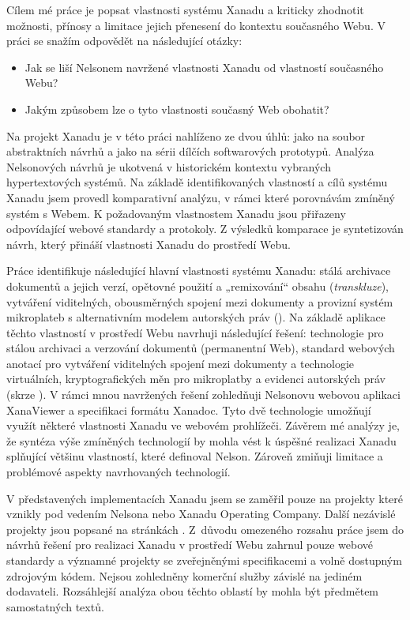 Cílem mé práce je popsat vlastnosti systému Xanadu a kriticky zhodnotit možnosti, přínosy a limitace jejich přenesení do kontextu současného Webu.
V práci se snažím odpovědět na následující otázky:

\begin{itemize}
\item Jak se liší Nelsonem navržené vlastnosti Xanadu od vlastností současného Webu?
\item Jakým způsobem lze o tyto vlastnosti současný Web obohatit?
\end{itemize}

Na projekt Xanadu je v této práci nahlíženo ze dvou úhlů: jako na soubor abstraktních návrhů a jako na sérii dílčích softwarových prototypů. Analýza Nelsonových návrhů je ukotvená v historickém kontextu vybraných hypertextových systémů. Na základě identifikovaných vlastností a cílů systému Xanadu jsem provedl komparativní analýzu, v rámci které porovnávám zmíněný systém s Webem. K požadovaným vlastnostem Xanadu jsou přiřazeny odpovídající webové standardy a protokoly. Z výsledků komparace je syntetizován návrh, který přináší vlastnosti Xanadu do prostředí Webu.

Práce identifikuje následující hlavní vlastnosti systému Xanadu: stálá archivace dokumentů a jejich verzí, opětovné použití a „remixování“ obsahu (\emph{transkluze}), vytváření viditelných, obousměrných spojení mezi dokumenty a provizní systém mikroplateb s alternativním modelem autorských práv ().
Na základě aplikace těchto vlastností v prostředí Webu navrhuji následující řešení:  technologie pro stálou archivaci a verzování dokumentů (permanentní Web), standard webových anotací pro vytváření viditelných spojení mezi dokumenty a technologie virtuálních, kryptografických měn pro mikroplatby a evidenci autorských práv (skrze ).
V rámci mnou navržených řešení zohledňuji Nelsonovu webovou aplikaci XanaViewer a specifikaci formátu Xanadoc. Tyto dvě technologie umožňují využít některé vlastnosti Xanadu ve webovém prohlížeči.
Závěrem mé analýzy je, že syntéza výše zmíněných technologií by mohla vést k úspěšné realizaci Xanadu splňující většinu vlastností, které definoval Nelson. Zároveň zmiňuji limitace a problémové aspekty navrhovaných technologií.

V představených implementacích Xanadu jsem se zaměřil pouze na projekty které vznikly pod vedením Nelsona nebo Xanadu Operating Company. Další nezávislé projekty jsou popsané na stránkách  \autocite{Hyperworlds}.
Z~důvodu omezeného rozsahu práce jsem do návrhů řešení pro realizaci Xanadu v prostředí Webu zahrnul pouze webové standardy a významné  projekty se zveřejněnými specifikacemi a volně dostupným zdrojovým kódem. Nejsou zohledněny komerční služby závislé na jediném dodavateli. Rozsáhlejší analýza obou těchto oblastí by mohla být předmětem samostatných textů.


